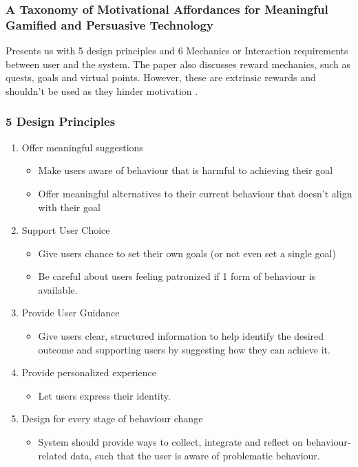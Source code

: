 \subsubsection*{A Taxonomy of Motivational Affordances for Meaningful Gamified and Persuasive Technology}

  Presents us with 5 design principles and 6 Mechanics or Interaction requirements between user and the system. The paper also discusses reward mechanics, such as quests, goals and virtual points. However, these are extrinsic rewards and shouldn't be used as they hinder motivation \cite{article_beyond_self_tracking_designing_apps}.

  \subsubsection*{5 Design Principles}

    \begin{enumerate}

    \item Offer meaningful suggestions
      \begin{itemize}
        \item Make users aware of behaviour that is harmful to achieving their goal
        \item Offer meaningful alternatives to their current behaviour that doesn't align with their goal
      \end{itemize}

    \item Support User Choice
      \begin{itemize}
        \item Give users chance to set their own goals (or not even set a single goal)
        \item Be careful about users feeling patronized if 1 form of behaviour is available.
      \end{itemize}

    \item Provide User Guidance
      \begin{itemize}
        \item Give users clear, structured information to help identify the desired outcome and supporting users by suggesting how they can achieve it.
      \end{itemize}

    \item Provide personalized experience
      \begin{itemize}
        \item Let users express their identity.
      \end{itemize}

    \item Design for every stage of behaviour change
      \begin{itemize}
        \item System should provide ways to collect, integrate and reflect on behaviour-related data, such that the user is aware of problematic behaviour.
      \end{itemize}

    \end{enumerate}

